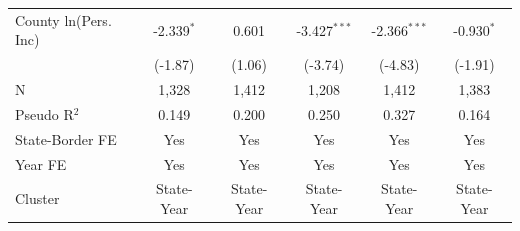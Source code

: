\begin{tabular*}{\textwidth}{@{\extracolsep{\fill}}lccccc}
   County ln(Pers. Inc) & -2.339$^{*}$  & 0.601          & -3.427$^{***}$ & -2.366$^{***}$ & -0.930$^{*}$\\   
                        & (-1.87)      & (1.06)        & (-3.74)       & (-4.83)       & (-1.91)\\   
   \hline
   N         & 1,328         & 1,412          & 1,208          & 1,412          & 1,383\\  
   Pseudo R$^2$         & 0.149         & 0.200          & 0.250          & 0.327          & 0.164\\  
   State-Border FE      & Yes           & Yes            & Yes            & Yes            & Yes\\  
   Year FE              & Yes           & Yes            & Yes            & Yes            & Yes\\  
   Cluster              & State-Year & State-Year & State-Year & State-Year & State-Year\\  
   \bottomrule
\end{tabular*}
\par\endgroup
